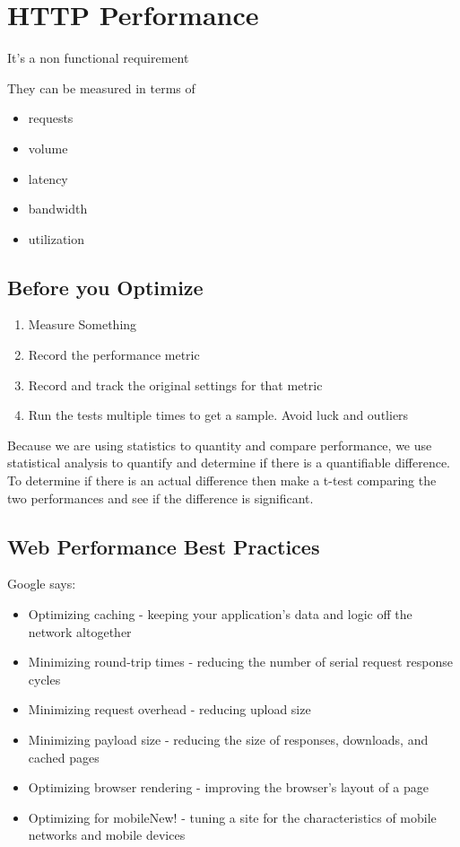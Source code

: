 \documentclass[../CMPUT-404-Notes.tex]{subfiles}
\begin{document}
\chapter{HTTP Performance}
It's a non functional requirement

They can be measured in terms of 
\begin{itemize}
    \item requests
    \item volume
    \item latency
    \item bandwidth
    \item utilization 
\end{itemize}

\section{Before you Optimize}
\begin{enumerate}
    \item Measure Something
    \item Record the performance metric
    \item Record and track the original settings for that metric
    \item Run the tests multiple times to get a sample. Avoid luck and outliers
\end{enumerate}

Because we are using statistics to quantity and compare performance, we use statistical analysis to quantify and determine if there is a quantifiable difference. 
To determine if there is an actual difference then make a t-test comparing the two performances and see if the difference is significant. 

\section{Web Performance Best Practices}
Google says:
\begin{itemize}
    \item Optimizing caching - keeping your application's data and logic off the
    network altogether
    \item Minimizing round-trip times - reducing the number of serial request response cycles
    \item Minimizing request overhead - reducing upload size
    \item Minimizing payload size - reducing the size of responses, downloads, and cached pages
    \item Optimizing browser rendering - improving the browser's layout of a page
    \item Optimizing for mobileNew! - tuning a site for the characteristics of mobile
    networks and mobile devices
\end{itemize}
\end{document}
